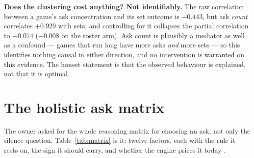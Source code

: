 \documentclass[11pt]{article}
\begin{document}
\textbf{Does the clustering cost anything? Not identifiably.} The raw correlation between
a game's ask concentration and its set outcome is $-0.443$, but ask \emph{count}
correlates $+0.929$ with sets, and controlling for it collapses the partial correlation to
$-0.074$ ($-0.008$ on the roster arm). Ask count is plausibly a mediator as well as a
confound --- games that run long have more asks \emph{and} more sets --- so this
identifies nothing causal in either direction, and no intervention is warranted on this
evidence. The honest statement is that the observed behaviour is explained, not that it is
optimal.

\section{The holistic ask matrix}
\label{sec:matrix}

The owner asked for the whole reasoning matrix for choosing an ask, not only the silence
question. Table~\ref{tab:matrix} is it: twelve factors, each with the rule it rests on,
the sign it should carry, and whether the engine prices it today \cite{asking}.
\end{document}
